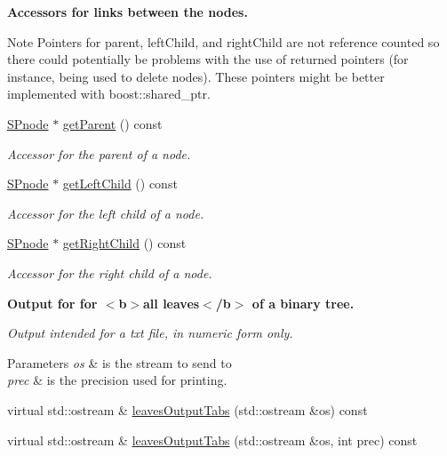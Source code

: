 \begin{Indent}{\bf \-Accessors for links between the nodes.}\par
{\em \begin{DoxyNote}{\-Note}
\-Pointers for parent, left\-Child, and right\-Child are not reference counted so there could potentially be problems with the use of returned pointers (for instance, being used to delete nodes). \-These pointers might be better implemented with boost\-::shared\-\_\-ptr. 
\end{DoxyNote}
}\begin{DoxyCompactItemize}
\item 
\hyperlink{classsubpavings_1_1SPnode}{\-S\-Pnode} $\ast$ \hyperlink{classsubpavings_1_1SPnode_ad25db2635b9fa09515a3cb75f4a7ccef}{get\-Parent} () const 
\begin{DoxyCompactList}\small\item\em \-Accessor for the parent of a node. \end{DoxyCompactList}\item 
\hyperlink{classsubpavings_1_1SPnode}{\-S\-Pnode} $\ast$ \hyperlink{classsubpavings_1_1SPnode_a2ae7370c24e6c51a99c8bd29b2ffcec3}{get\-Left\-Child} () const 
\begin{DoxyCompactList}\small\item\em \-Accessor for the left child of a node. \end{DoxyCompactList}\item 
\hyperlink{classsubpavings_1_1SPnode}{\-S\-Pnode} $\ast$ \hyperlink{classsubpavings_1_1SPnode_a9477b1cfe157f5730a5514c944953689}{get\-Right\-Child} () const 
\begin{DoxyCompactList}\small\item\em \-Accessor for the right child of a node. \end{DoxyCompactList}\end{DoxyCompactItemize}
\end{Indent}
\begin{Indent}{\bf \-Output for for $<$b$>$all leaves$<$/b$>$ of a binary tree.}\par
{\em \-Output intended for a txt file, in numeric form only.


\begin{DoxyParams}{\-Parameters}
{\em os} & is the stream to send to \\
\hline
{\em prec} & is the precision used for printing. \\
\hline
\end{DoxyParams}
}\begin{DoxyCompactItemize}
\item 
virtual std\-::ostream \& \hyperlink{classsubpavings_1_1SPnode_a3663133a2c9f0fce79f3f551c1d163de}{leaves\-Output\-Tabs} (std\-::ostream \&os) const 
\item 
virtual std\-::ostream \& \hyperlink{classsubpavings_1_1SPnode_ac0d9484691c21a316308b4713e6e8bba}{leaves\-Output\-Tabs} (std\-::ostream \&os, int prec) const 
\end{DoxyCompactItemize}
\end{Indent}
